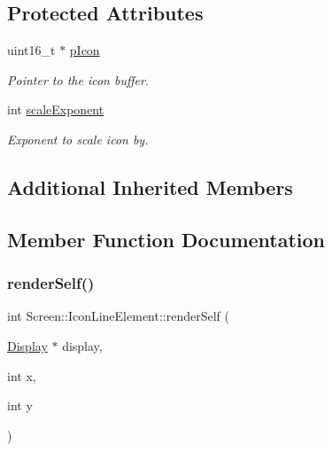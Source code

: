 \subsection*{Protected Attributes}
\begin{DoxyCompactItemize}
\item 
\mbox{\label{classScreen_1_1IconLineElement_ae84108a5bfda7ba013401c067a8c9aca}} 
uint16\+\_\+t $\ast$ \mbox{\hyperlink{classScreen_1_1IconLineElement_ae84108a5bfda7ba013401c067a8c9aca}{p\+Icon}}
\begin{DoxyCompactList}\small\item\em Pointer to the icon buffer. \end{DoxyCompactList}\item 
int \mbox{\hyperlink{classScreen_1_1IconLineElement_a95ab319fab5abe27266a092fdb75b58e}{scale\+Exponent}}
\begin{DoxyCompactList}\small\item\em Exponent to scale icon by. \end{DoxyCompactList}\end{DoxyCompactItemize}
\subsection*{Additional Inherited Members}


\subsection{Member Function Documentation}
\mbox{\label{classScreen_1_1IconLineElement_a3ee090b31ee5061974552be4688d937b}} 
\subsubsection{\texorpdfstring{render\+Self()}{renderSelf()}}
{\footnotesize\ttfamily int Screen\+::\+Icon\+Line\+Element\+::render\+Self (\begin{DoxyParamCaption}\item[{\mbox{\hyperlink{classDisplay}{Display}} $\ast$}]{display,  }\item[{int}]{x,  }\item[{int}]{y }\end{DoxyParamCaption})\hspace{0.3cm}{\ttfamily [virtual]}}




